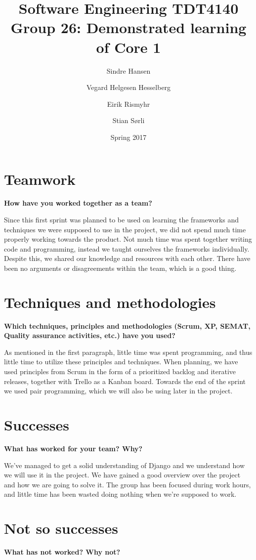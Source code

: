 \documentclass[12pt, a4paper]{article}
\title{Software Engineering TDT4140 \\ Group 26: Demonstrated learning of Core 1}
\author{Sindre Hansen \and Vegard Helgesen Hesselberg \and Eirik Rismyhr \and Stian Sørli}
\date{Spring 2017}
\begin{document}
\maketitle

\section{Teamwork}
\textbf{How have you worked together as a team?}

Since this first sprint was planned to be used on learning the frameworks and techniques we were supposed to use in the project, we did not spend much time properly working towards the product.
Not much time was spent together writing code and programming, instead we taught ourselves the frameworks individually. Despite this, we shared our knowledge and resources with each other.
There have been no arguments or disagreements within the team, which is a good thing.


\section{Techniques and methodologies}
\textbf{Which techniques, principles and methodologies (Scrum, XP, SEMAT, Quality assurance activities, etc.) have you used?}

As mentioned in the first paragraph, little time was spent programming, and thus little time to utilize these principles and techniques.
When planning, we have used principles from Scrum in the form of a prioritized backlog and iterative releases, together with Trello as a Kanban board.
Towards the end of the sprint we used pair programming, which we will also be using later in the project.


\section{Successes}
\textbf{What has worked for your team? Why?}

We've managed to get a solid understanding of Django and we understand how we will use it in the project. We have gained a good overview over the project and how we are going to solve it.
The group has been focused during work hours, and little time has been wasted doing nothing when we're supposed to work.


\section{Not so successes}
\textbf{What has not worked? Why not?}
\end{document}
